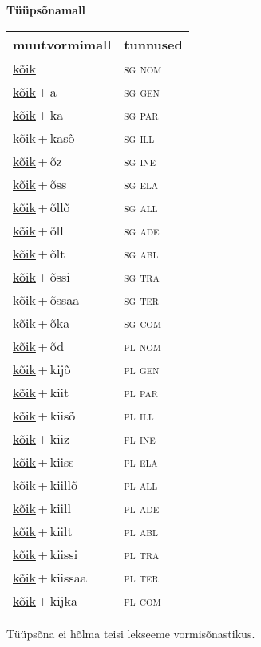 
\vspace{1.8em}
\begin{minipage}{\textwidth}
\textbf{Tüüpsõnamall \,}\\

\begin{sideways}
\begin{tabular}{l l}
muutvormimall & tunnused \\
\hline
\underline{kõik} & \textsc{ sg nom } \\
\underline{kõik}\,+\,a & \textsc{ sg gen } \\
\underline{kõik}\,+\,ka & \textsc{ sg par } \\
\underline{kõik}\,+\,kasõ & \textsc{ sg ill } \\
\underline{kõik}\,+\,õz & \textsc{ sg ine } \\
\underline{kõik}\,+\,õss & \textsc{ sg ela } \\
\underline{kõik}\,+\,õllõ & \textsc{ sg all } \\
\underline{kõik}\,+\,õll & \textsc{ sg ade } \\
\underline{kõik}\,+\,õlt & \textsc{ sg abl } \\
\underline{kõik}\,+\,õssi & \textsc{ sg tra } \\
\underline{kõik}\,+\,õssaa & \textsc{ sg ter } \\
\underline{kõik}\,+\,õka & \textsc{ sg com } \\
\underline{kõik}\,+\,õd & \textsc{ pl nom } \\
\underline{kõik}\,+\,kijõ & \textsc{ pl gen } \\
\underline{kõik}\,+\,kiit & \textsc{ pl par } \\
\underline{kõik}\,+\,kiisõ & \textsc{ pl ill } \\
\underline{kõik}\,+\,kiiz & \textsc{ pl ine } \\
\underline{kõik}\,+\,kiiss & \textsc{ pl ela } \\
\underline{kõik}\,+\,kiillõ & \textsc{ pl all } \\
\underline{kõik}\,+\,kiill & \textsc{ pl ade } \\
\underline{kõik}\,+\,kiilt & \textsc{ pl abl } \\
\underline{kõik}\,+\,kiissi & \textsc{ pl tra } \\
\underline{kõik}\,+\,kiissaa & \textsc{ pl ter } \\
\underline{kõik}\,+\,kijka & \textsc{ pl com } \\
\end{tabular}
\end{sideways}
\label{tab:tüüpsõnamall-kõik}

\end{minipage}

 
\vspace{1em}
\noindent Tüüpsõna ei hõlma teisi lekseeme vormi\-sõnastikus.
